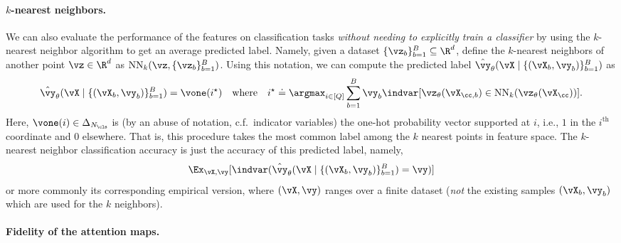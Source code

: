 \documentclass[../../book-main.tex]{subfiles}
\begin{document}
\paragraph{\(k\)-nearest neighbors.}  We can also evaluate the performance of the features on classification tasks \textit{without needing to explicitly train a classifier} by using the \(k\)-nearest neighbor algorithm to get an average predicted label. Namely, given a dataset \(\{\vz_{b}\}_{b = 1}^{B} \subseteq \R^{d}\), define the \(k\)-nearest neighbors of another point \(\vz \in \R^{d}\) as \(\operatorname{NN}_{k}(\vz, \{\vz_{b}\}_{b = 1}^{B})\). Using this notation, we can compute the predicted label \(\hat{\vy}_{\theta}(\vX \mid \{(\vX_{b}, \vy_{b})\}_{b = 1}^{B})\) as 
\begin{equation}
    \hat{\vy}_{\theta}(\vX \mid \{(\vX_{b}, \vy_{b})\}_{b = 1}^{B}) = \vone(i^{\star}) \quad \text{where} \quad i^{\star} \doteq \argmax_{i \in [Q]}\sum_{b = 1}^{B}\vy_{b}\indvar[\vz_{\theta}(\vX_{\cc, b}) \in \operatorname{NN}_{k}(\vz_{\theta}(\vX_{\cc}))].
\end{equation}
Here, \(\vone(i) \in \Delta_{N_{\cls}}\) is (by an abuse of notation, c.f.~indicator variables) the one-hot probability vector supported at \(i\), i.e., \(1\) in the \(i^{\mathrm{th}}\) coordinate and \(0\) elsewhere. That is, this procedure takes the most common label among the \(k\) nearest points in feature space. The \(k\)-nearest neighbor classification accuracy is just the accuracy of this predicted label, namely,
\begin{equation}
    \Ex_{\vX, \vy}[\indvar(\hat{\vy}_{\theta}(\vX \mid \{(\vX_{b}, \vy_{b})\}_{b = 1}^{B}) = \vy)]
\end{equation}
or more commonly its corresponding empirical version, where \((\vX, \vy)\) ranges over a finite dataset (\textit{not} the existing samples \((\vX_{b}, \vy_{b})\) which are used for the \(k\) neighbors).

\paragraph{Fidelity of the attention maps.}
\end{document}
